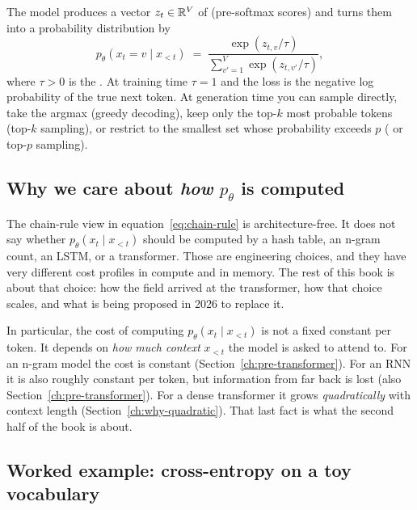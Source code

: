 The model produces a vector \(z_t \in \mathbb{R}^{V}\) of  (pre-softmax
scores) and turns them into a probability distribution by
\begin{equation}
  p_\theta(x_t = v \mid x_{<t})
  \;=\;
  \frac{\exp(z_{t,v} / \tau)}{\sum_{v'=1}^{V} \exp(z_{t,v'} / \tau)},
  \label{eq:softmax}
\end{equation}
where \(\tau > 0\) is the . At training time \(\tau = 1\)
and the loss is the negative log probability of the true next token. At
generation time you can sample directly, take the argmax (greedy decoding),
keep only the top-\(k\) most probable tokens (top-\(k\) sampling), or restrict
to the smallest set whose probability exceeds \(p\) ( or
top-\(p\) sampling).

\subsection{Why we care about \emph{how} \(p_\theta\) is computed}

The chain-rule view in equation~\eqref{eq:chain-rule} is architecture-free. It
does not say whether \(p_\theta(x_t \mid x_{<t})\) should be computed by a
hash table, an n-gram count, an LSTM, or a transformer. Those are
engineering choices, and they have very different cost profiles in compute
and in memory. The rest of this book is about that choice: how the field
arrived at the transformer, how that choice scales, and what is being
proposed in 2026 to replace it.

In particular, the cost of computing \(p_\theta(x_t \mid x_{<t})\) is not a
fixed constant per token. It depends on \emph{how much context} \(x_{<t}\) the
model is asked to attend to. For an n-gram model the cost is constant
(Section~\ref{ch:pre-transformer}). For an RNN it is also roughly constant
per token, but information from far back is lost (also
Section~\ref{ch:pre-transformer}). For a dense transformer it grows
\emph{quadratically} with context length (Section~\ref{ch:why-quadratic}).
That last fact is what the second half of the book is about.

\subsection{Worked example: cross-entropy on a toy vocabulary}

